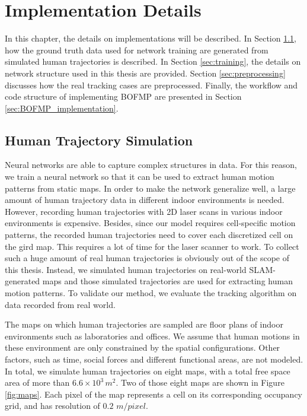 
\chapter{Implementation Details} \label{chapter:4}

In this chapter, the details on implementations will be described. In Section \ref{sec:traj_sim}, how the ground truth data used for network training are generated from simulated human trajectories is described. In Section \ref{sec:training}, the details on network structure used in this thesis are provided. Section \ref{sec:preprocessing} discusses how the real tracking cases are preprocessed. Finally, the workflow and code structure of implementing BOFMP are presented in Section \ref{sec:BOFMP_implementation}.

\section{Human Trajectory Simulation} \label{sec:traj_sim}

Neural networks are able to capture complex structures in data. For this reason, we train a neural network so that it can be used to extract human motion patterns from static maps. In order to make the network generalize well, a large amount of human trajectory data in different indoor environments is needed. However, recording human trajectories with 2D laser scans in various indoor environments is expensive. Besides, since our model requires cell-specific motion patterns, the recorded human trajectories need to cover each discretized cell on the gird map. This requires a lot of time for the laser scanner to work. To collect such a huge amount of real human trajectories is obviously out of the scope of this thesis. Instead, we simulated human trajectories on real-world SLAM-generated maps and those simulated trajectories are used for extracting human motion patterns. To validate our method, we evaluate the tracking algorithm on data recorded from real world. 

The maps on which human trajectories are sampled are floor plans of indoor environments such as laboratories and offices. We assume that human motions in these environment are only constrained by the spatial configurations. Other factors, such as time, social forces and different functional areas, are not modeled. In total, we simulate human trajectories on eight maps, with a total free space area of more than \( 6.6\times10^3 \, m^2 \). Two of those eight maps are shown in Figure \ref{fig:maps}. Each pixel of the map represents a cell on its corresponding occupancy grid, and has resolution of $0.2$ $m/pixel$.

